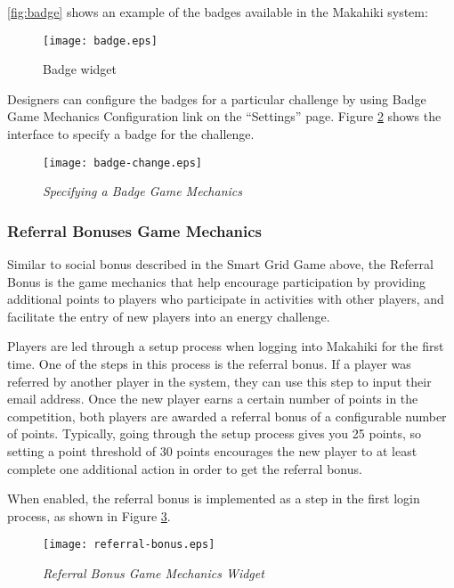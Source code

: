 \autoref{fig:badge} shows an example of the badges available in the Makahiki system:

\begin{figure}[t!]
  \center
  \texttt{[image: badge.eps]}
  \caption{Badge widget}
  \label{fig:badge}
\end{figure}

Designers can configure the badges for a particular challenge by using Badge Game Mechanics Configuration link on the ``Settings'' page. Figure \ref{fig:badge-change} shows the interface to specify a badge for the challenge.

\begin{figure}[!ht]
  \center
  \texttt{[image: badge-change.eps]}
  \caption{\em Specifying a Badge Game Mechanics}
  \label{fig:badge-change}
\end{figure}

\clearpage

\subsubsection{Referral Bonuses Game Mechanics}

Similar to social bonus described in the Smart Grid Game above, the Referral Bonus is the game mechanics that help encourage participation by providing additional points to players who participate in activities with other players, and facilitate the entry of new players into an energy challenge.

Players are led through a setup process when logging into Makahiki for the first time. One of the steps in this process is the referral bonus. If a player was referred by another player in the system, they can use this step to input their email address. Once the new player earns a certain number of points in the competition, both players are awarded a referral bonus of a configurable number of points. Typically, going through the setup process gives you 25 points, so setting a point threshold of 30 points encourages the new player to at least complete one additional action in order to get the referral bonus.

When enabled, the referral bonus is implemented as a step in the first login process, as shown in Figure \ref{fig:referral-bonus}.

\begin{figure}[!ht]
  \center
  \texttt{[image: referral-bonus.eps]}
  \caption{\em Referral Bonus Game Mechanics Widget}
  \label{fig:referral-bonus}
\end{figure}

